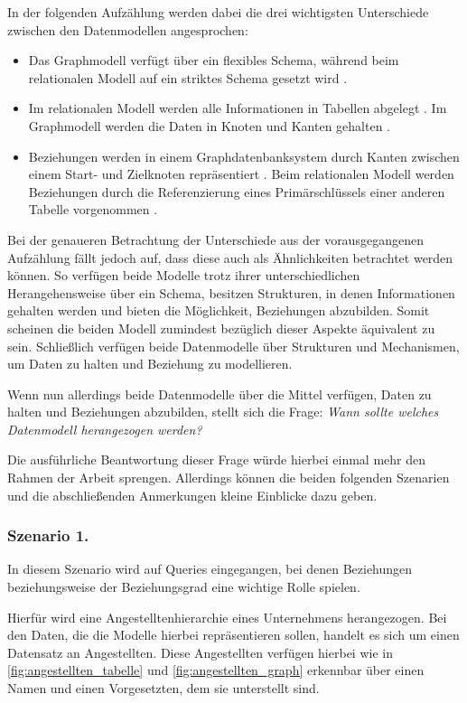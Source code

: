In der folgenden Aufzählung werden dabei die drei wichtigsten Unterschiede zwischen den Datenmodellen angesprochen:
\begin{itemize}
    \item Das Graphmodell verfügt über ein flexibles Schema, während beim relationalen Modell auf ein striktes Schema gesetzt wird \cite{gdbms,rdbms_book}.
    \item Im relationalen Modell werden alle Informationen in Tabellen abgelegt \cite{rdbms_book}. Im Graphmodell werden die Daten in Knoten und Kanten gehalten \cite{gdbms}. 
    \item Beziehungen werden in einem Graphdatenbanksystem durch Kanten zwischen einem Start- und Zielknoten repräsentiert \cite{gdbms}. Beim relationalen Modell werden Beziehungen durch die Referenzierung eines Primärschlüssels einer anderen Tabelle vorgenommen \cite{rdbms_book}. 
\end{itemize}
Bei der genaueren Betrachtung der Unterschiede aus der vorausgegangenen Aufzählung fällt jedoch auf, dass diese auch als Ähnlichkeiten betrachtet werden können. So verfügen beide Modelle trotz ihrer unterschiedlichen Herangehensweise über ein Schema, besitzen Strukturen, in denen Informationen gehalten werden und bieten die Möglichkeit, Beziehungen abzubilden. Somit scheinen die beiden Modell zumindest bezüglich dieser Aspekte äquivalent zu sein. Schließlich verfügen beide Datenmodelle über Strukturen und Mechanismen, um Daten zu halten und Beziehung zu modellieren. 

Wenn nun allerdings beide Datenmodelle über die Mittel verfügen, Daten zu halten und Beziehungen abzubilden, stellt sich die Frage: \textit{Wann sollte welches Datenmodell herangezogen werden?}

Die ausführliche Beantwortung dieser Frage würde hierbei einmal mehr den Rahmen der Arbeit sprengen. Allerdings können die beiden folgenden Szenarien und die abschließenden Anmerkungen kleine Einblicke dazu geben. 

\subsubsection{Szenario 1.}
In diesem Szenario wird auf Queries eingegangen, bei denen Beziehungen beziehungsweise der Beziehungsgrad eine wichtige Rolle spielen. 

Hierfür wird eine Angestelltenhierarchie eines Unternehmens herangezogen. Bei den Daten, die die Modelle hierbei repräsentieren sollen, handelt es sich um einen Datensatz an Angestellten. Diese Angestellten verfügen hierbei wie in \autoref{fig:angestellten_tabelle} und \autoref{fig:angestellten_graph} erkennbar über einen Namen und einen Vorgesetzten, dem sie unterstellt sind. 

